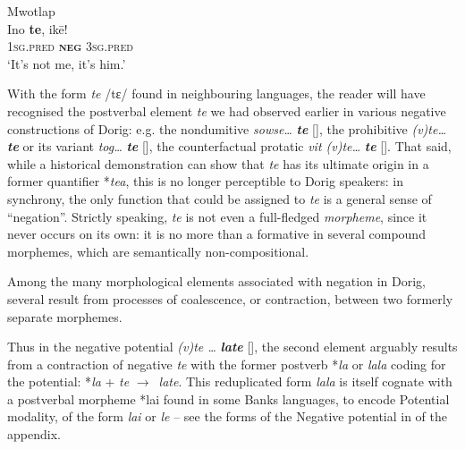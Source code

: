 \documentclass[output=paper,colorlinks,citecolor=brown,draft]{langscibook}
\begin{document}
\ea\label{ex:dor:jesp} Mwotlap \quad \citep[318]{François2003}\\ 
    \gll Ino \textbf{te}, ikē!\\
        \textsc{1sg}.\textsc{pred} \textbf{\textsc{neg}} \textsc{3sg}.\textsc{pred}\\
    \glt ‘It’s not me, it’s him.’ 
\z 

With the form \textit{te} /tɛ/ found in neighbouring languages, the reader will have recognised the postverbal element \textit{te} we had observed earlier in various negative constructions of Dorig: e.g. the nondumitive \textit{sowse…} \textbf{\textit{te}} [], the prohibitive \textit{(v)te…} \textbf{\textit{te}} or its variant \textit{tog…} \textbf{\textit{te}} [], the counterfactual protatic \textit{vit (v)te…} \textbf{\textit{te}} [].
That said, while a historical demonstration can show that \textit{te} has its \mbox{ultimate} origin in a former quantifier *\textit{tea}, this is no longer perceptible to Dorig speakers: in synchrony, the only function that could be assigned to \textit{te} is a \mbox{general} sense of “negation”. Strictly speaking, \textit{te} is not even a full-fledged \textit{morpheme}, since it never occurs on its own: it is no more than a formative in several compound morphemes, which are semantically non-compositional.


\label{sec:dor:5.2}

Among the many morphological elements associated with negation in Dorig, \mbox{several} result from processes of coalescence, or contraction, between two formerly separate morphemes.

Thus in the negative potential \textit{(v)te …} \textbf{\textit{late}} [], the second element \mbox{arguably} results from a contraction of negative \textit{te} with the former postverb *\textit{la} or \textit{lala} coding for the potential: *\textit{la} + \textit{te} \textrm{${\rightarrow}$}~\textit{late}. This reduplicated form \textit{lala} is itself cognate with a postverbal morpheme *lai found in some Banks languages, to encode \mbox{Potential} modality, of the form \textit{lai} or \textit{le} – see the forms of the Negative potential in  of the appendix.
\end{document}
